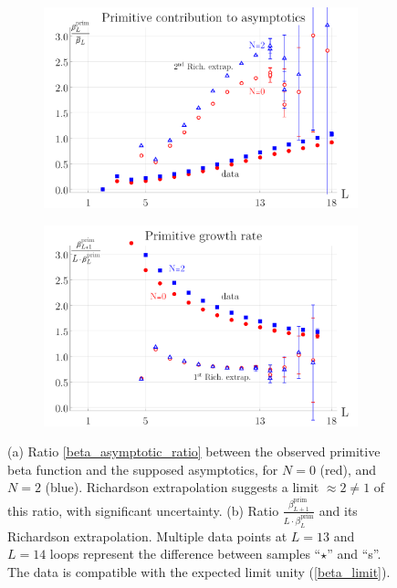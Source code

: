 \documentclass[11pt,a4paper]{article}
\renewcommand{\|}{\rule[-0.4ex]{0.2ex}{1.2em}}
\begin{document}
\begin{figure}[htb]
	\centering 
	\begin{subfigure}[b]{.49 \textwidth}
		\includegraphics[width=\linewidth]{beta_relative}
		\subcaption{}
		\label{fig:beta_relative}
	\end{subfigure}
	\begin{subfigure}[b]{.49 \textwidth}
		\includegraphics[width=\linewidth]{beta_growth_rate}
		\subcaption{}
		\label{fig:beta_growth_rate}
	\end{subfigure}
	
	\caption{(a) Ratio \cref{beta_asymptotic_ratio} between the observed primitive beta function and the supposed asymptotics, for $N=0$ (red),  and $N=2$ (blue). Richardson extrapolation  suggests a limit $\approx 2\neq 1$ of this ratio, with significant uncertainty. (b) Ratio $\frac{\beta^{\text{prim}}_{L+1}}{L\cdot \beta^{\text{prim}}_{L}}$ and its Richardson extrapolation. Multiple data points at $L=13$ and $L=14$ loops represent the difference between samples \enquote{$\star$} and \enquote{s}. The data is compatible with the expected limit unity (\cref{beta_limit}). }
	\label{fig:beta_ratios}
\end{figure}
\end{document}
